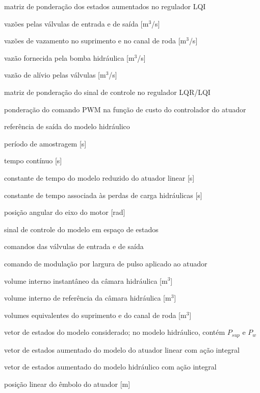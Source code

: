 \begin{simbolos}
    \item[$Q_a$] matriz de ponderação dos estados aumentados no regulador LQI
    \item[$Q_{in}$, $Q_{out}$] vazões pelas válvulas de entrada e de saída [m$^3$/s]
    \item[$Q_{leak,sup}$, $Q_{leak,w}$] vazões de vazamento no suprimento e no canal de roda [m$^3$/s]
    \item[$Q_{pump}$] vazão fornecida pela bomba hidráulica [m$^3$/s]
    \item[$Q_{valv}$] vazão de alívio pelas válvulas [m$^3$/s]
    \item[$R$] matriz de ponderação do sinal de controle no regulador LQR/LQI
    \item[$R_u$] ponderação do comando PWM na função de custo do controlador do atuador
    \item[$r$] referência de saída do modelo hidráulico
    \item[$T_s$] período de amostragem [s]
    \item[$t$] tempo contínuo [s]
    \item[$\tau$] constante de tempo do modelo reduzido do atuador linear [s]
    \item[$\tau_h$] constante de tempo associada às perdas de carga hidráulicas [s]
    \item[$\theta_m$] posição angular do eixo do motor [rad]
    \item[$u$] sinal de controle do modelo em espaço de estados
    \item[$u_{in}$, $u_{out}$] comandos das válvulas de entrada e de saída
    \item[$u_{\mathrm{PWM}}$] comando de modulação por largura de pulso aplicado ao atuador
    \item[$V(t)$] volume interno instantâneo da câmara hidráulica [m$^3$]
    \item[$V_0$] volume interno de referência da câmara hidráulica [m$^3$]
    \item[$V_{sup}$, $V_w$] volumes equivalentes do suprimento e do canal de roda [m$^3$]
    \item[$x$] vetor de estados do modelo considerado; no modelo hidráulico, contém $P_{sup}$ e $P_w$
    \item[$x_a$] vetor de estados aumentado do modelo do atuador linear com ação integral
    \item[$x_{aug}$] vetor de estados aumentado do modelo hidráulico com ação integral
    \item[$x_{\mathrm{LAC}}$] posição linear do êmbolo do atuador [m]

\end{simbolos}
